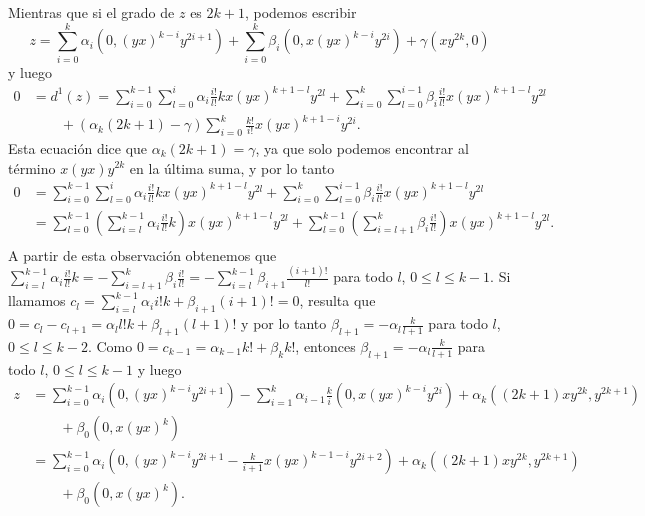 \documentclass[fleqn,../tesis.tex]{subfiles}
\begin{document}
Mientras que si el grado de $z$ es $2k + 1$, podemos escribir
\[
    z = \sum_{i = 0}^{k}\alpha_i \left(0, (yx)^{k - i}y^{2i + 1}\right) + \sum_{i = 0}^{k}\beta_i \left(0, x(yx)^{k - i}y^{2i}\right)
        +\gamma\left(xy^{2k}, 0\right)
\]
y luego
\begin{align*}
    0 &= d^{1}(z) = \sum_{i = 0}^{k - 1}\sum_{l = 0}^{i}\alpha_i \frac{i!}{l!}kx(yx)^{k + 1 - l}y^{2l}
        + \sum_{i = 0}^{k}\sum_{l = 0}^{i - 1}\beta_i\frac{i!}{l!}x(yx)^{k + 1 - l}y^{2l}\\
        &\qquad + \left(\alpha_k (2k + 1) - \gamma\right)\sum_{i = 0}^{k}\frac{k!}{i!}x(yx)^{k + 1- i}y^{2i}.
\end{align*}
Esta ecuación dice que $\alpha_k (2k + 1) = \gamma$, ya que solo podemos encontrar al término $x(yx)y^{2k}$ en la última suma, y por lo tanto 
\begin{align*}
    0 &= \sum_{i = 0}^{k - 1}\sum_{l = 0}^{i}\alpha_i \frac{i!}{l!}kx(yx)^{k + 1 - l}y^{2l}
        + \sum_{i = 0}^{k}\sum_{l = 0}^{i - 1}\beta_i\frac{i!}{l!}x(yx)^{k + 1 - l}y^{2l}\\
    &=   \sum_{l = 0}^{k - 1}\left(\sum_{i = l}^{k - 1}\alpha_i \frac{i!}{l!}k\right)x(yx)^{k + 1 - l}y^{2l}
        + \sum_{l = 0}^{k - 1}\left(\sum_{i = l + 1}^{k}\beta_i\frac{i!}{l!}\right)x(yx)^{k + 1 - l}y^{2l}.\\
\end{align*}
A partir de esta observación obtenemos que
$\sum_{i = l}^{k - 1}\alpha_i \frac{i!}{l!}k = -\sum_{i = l + 1}^{k}\beta_i\frac{i!}{l!} = -\sum_{i = l}^{k - 1}\beta_{i + 1}\frac{(i + 1)!}{l!}$
para todo $l$, $0\leq l \leq k - 1$. Si llamamos $c_l = \sum_{i = l}^{k - 1}\alpha_i i!k + \beta_{i + 1}(i + 1)! = 0$, resulta que
$0 = c_l - c_{l + 1} = \alpha_l l!k + \beta_{l + 1}(l + 1)!$ y por lo tanto $\beta_{l + 1} = -\alpha_l \frac{k}{l + 1}$ para todo $l$,
$0 \leq l \leq k - 2$. Como  $0 = c_{k - 1} = \alpha_{k - 1}k! + \beta_k k!$, entonces $\beta_{l + 1} = -\alpha_l \frac{k}{l + 1}$ para todo $l$,
$0 \leq l \leq k - 1$ y luego
\begin{align*}
    z &= \sum_{i = 0}^{k - 1}\alpha_i \left(0, (yx)^{k - i}y^{2i + 1}\right) - \sum_{i = 1}^{k} \alpha_{i - 1} \frac{k}{i}\left(0, x(yx)^{k - i}y^{2i}\right)
        + \alpha_k\left((2k + 1)xy^{2k}, y^{2k + 1}\right)\\
    &\qquad + \beta_0 \left(0, x(yx)^{k}\right)\\
    &= \sum_{i = 0}^{k - 1}\alpha_i \left(0, (yx)^{k - i}y^{2i + 1} - \frac{k}{i + 1}x(yx)^{k - 1 - i}y^{2i + 2}\right)
        + \alpha_k\left((2k + 1)xy^{2k}, y^{2k + 1}\right)\\
    &\qquad + \beta_0 \left(0, x(yx)^{k}\right).
\end{align*}
\end{document}

